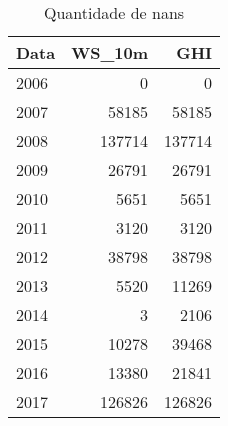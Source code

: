 
\begin{table}[ht]
	\centering
	\caption{Quantidade de \acrshort{nan}s}\label{tbl:nan}
	\begin{tabular}{lrr}
		\hline
		Data & WS\_10m &     GHI \\
		\hline
		\hline
		2006 &       0 &       0 \\
		2007 &   58185 &   58185 \\
		2008 &  137714 &  137714 \\
		2009 &   26791 &   26791 \\
		2010 &    5651 &    5651 \\
		2011 &    3120 &    3120 \\
		2012 &   38798 &   38798 \\
		2013 &    5520 &   11269 \\
		2014 &       3 &    2106 \\
		2015 &   10278 &   39468 \\
		2016 &   13380 &   21841 \\
		2017 &  126826 &  126826 \\
		\hline
	\end{tabular}
\end{table}
